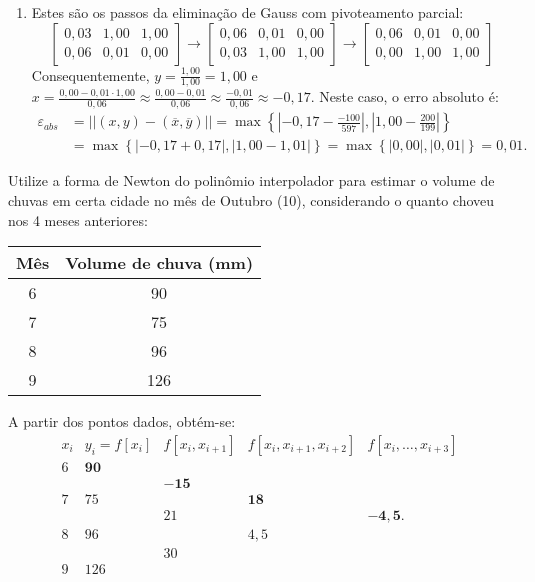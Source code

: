 \documentclass[12pt,a4paper]{article}
\begin{document}
\begin{ExerciseList}
\begin{enumerate}
\item Estes são os passos da eliminação de Gauss com pivoteamento parcial:
\[
\begin{bmatrix}
0,03 & 1,00 & 1,00\\
0,06 & 0,01 & 0,00
\end{bmatrix}
\rightarrow
\begin{bmatrix}
0,06 & 0,01 & 0,00\\
0,03 & 1,00 & 1,00
\end{bmatrix}
\rightarrow
\begin{bmatrix}
0,06 & 0,01 & 0,00\\
0,00 & 1,00 & 1,00
\end{bmatrix}
\]
Consequentemente, $y = \frac{1,00}{1,00} = 1,00$ e
$x = \frac{0,00 - 0,01 \cdot 1,00}{0,06}
\approx \frac{0,00 - 0,01}{0,06}
\approx \frac{-0,01}{0,06}
\approx -0,17$. Neste caso, o erro absoluto é:
\begin{align*}
\varepsilon_{abs}
& = ||(x,y) - (\overline{x},\overline{y})||
  = \max \left\{ \left|-0,17 - \frac{-100}{597}\right|, \left|1,00 - \frac{200}{199}\right| \right\}\\
& = \max \left\{ \left|-0,17 + 0,17\right|, \left|1,00 - 1,01\right| \right\} 
  = \max \left\{ \left|0,00\right|, \left|0,01\right| \right\}
  = 0,01.
\end{align*}
\end{enumerate}


\Exercise[title={2,5}]
Utilize a forma de Newton do polinômio interpolador para estimar o volume de chuvas em certa cidade no mês de Outubro (10), considerando o quanto choveu nos 4 meses anteriores:
\medskip
\begin{center}
\begin{tabular}{cc}
\hline
Mês & Volume de chuva (mm) \\ 
\hline
6 & 90 \\
7 & 75 \\
8 & 96 \\
9 & 126 \\
\hline
\end{tabular}
\end{center}
\Answer
A partir dos pontos dados, obtém-se:
\[
\begin{array}{ccccc}
x_i
& y_i=f[x_i]
& f[x_i,x_{i+1}]
& f[x_i,x_{i+1},x_{i+2}]
& f[x_i,\ldots,x_{i+3}]\\
6 & \mathbf{90} \\
     & & \mathbf{-15} \\
7 & 75 & & \mathbf{18} \\
     & & 21 & & \mathbf{-4,5}. \\
8 & 96 & & 4,5 \\
     & & 30 \\
9 & 126
\end{array}
\]


\end{ExerciseList}
\end{document}
